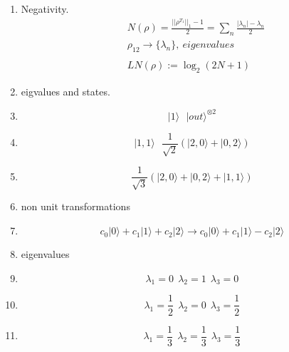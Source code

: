 \documentclass[12pt]{article}
\begin{document}
\begin{enumerate}
\item Negativity.
\begin{align*}
& N(\rho) = \frac{||\rho^{T_{1}}||_{1} - 1}{2}  =\sum_{n}  \frac{|\lambda_{n}| - \lambda_{n}}{2} \\
& \rho_{12}   \rightarrow  \{ \lambda_{n} \}, \ eigenvalues  \\
\\
& LN(\rho) := \log_{2}(2N + 1)
\end{align*}


\item eigvalues and states.

\item $$ |1\rangle   \ \ \ |out\rangle^{\otimes 2} $$

\item $$ |1,1\rangle   \ \ \ \frac{1}{\sqrt{2}}(|2,0\rangle + |0,2\rangle)  $$

\item $$  \frac{1}{\sqrt{3}}(|2,0\rangle + |0,2\rangle + |1,1\rangle )   $$

\item non unit transformations
\item $$  c_{0}|0\rangle  + c_{1}|1\rangle + c_{2}|2\rangle  \rightarrow  c_{0}|0\rangle  + c_{1}|1\rangle - c_{2}|2\rangle  $$

\item eigenvalues
\item $$  \lambda_{1} = 0  \ \ \lambda_{2} = 1  \ \  \lambda_{3} = 0 $$
\item $$  \lambda_{1} = \frac{1}{2}  \ \ \lambda_{2} = 0  \ \  \lambda_{3} = \frac{1}{2} $$
\item $$  \lambda_{1} = \frac{1}{3}  \ \ \lambda_{2} = \frac{1}{3}  \ \  \lambda_{3} = \frac{1}{3} $$



\end{enumerate}
\end{document}
